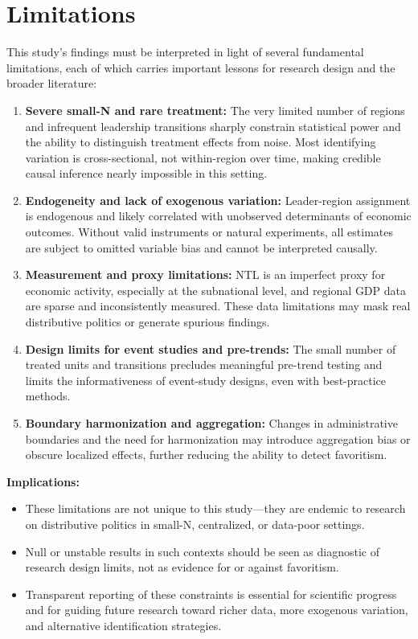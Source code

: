 \documentclass[12pt,a4paper]{article}
\begin{document}
\section{Limitations}

This study’s findings must be interpreted in light of several fundamental limitations, each of which carries important lessons for research design and the broader literature:

\begin{enumerate}
	\item \textbf{Severe small-N and rare treatment:} The very limited number of regions and infrequent leadership transitions sharply constrain statistical power and the ability to distinguish treatment effects from noise. Most identifying variation is cross-sectional, not within-region over time, making credible causal inference nearly impossible in this setting.
	\item \textbf{Endogeneity and lack of exogenous variation:} Leader-region assignment is endogenous and likely correlated with unobserved determinants of economic outcomes. Without valid instruments or natural experiments, all estimates are subject to omitted variable bias and cannot be interpreted causally.
	\item \textbf{Measurement and proxy limitations:} NTL is an imperfect proxy for economic activity, especially at the subnational level, and regional GDP data are sparse and inconsistently measured. These data limitations may mask real distributive politics or generate spurious findings.
	\item \textbf{Design limits for event studies and pre-trends:} The small number of treated units and transitions precludes meaningful pre-trend testing and limits the informativeness of event-study designs, even with best-practice methods.
	\item \textbf{Boundary harmonization and aggregation:} Changes in administrative boundaries and the need for harmonization may introduce aggregation bias or obscure localized effects, further reducing the ability to detect favoritism.
\end{enumerate}

\textbf{Implications:}
\begin{itemize}
	\item These limitations are not unique to this study—they are endemic to research on distributive politics in small-N, centralized, or data-poor settings.
	\item Null or unstable results in such contexts should be seen as diagnostic of research design limits, not as evidence for or against favoritism.
	\item Transparent reporting of these constraints is essential for scientific progress and for guiding future research toward richer data, more exogenous variation, and alternative identification strategies.
\end{itemize}
\end{document}
